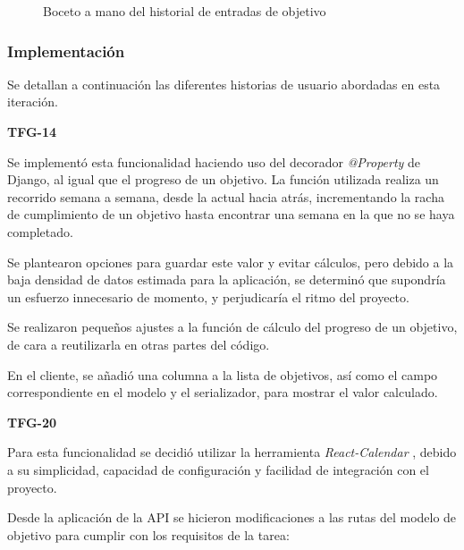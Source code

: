 \documentclass[10pt, a4paper]{aqademic}
\begin{document}
\begin{figure}[h!]
	\centering
	\caption{Boceto a mano del historial de entradas de objetivo}
\end{figure}


\subsubsection{Implementación}

Se detallan a continuación las diferentes historias de usuario abordadas en esta iteración.

\textbf{TFG-14}

Se implementó esta funcionalidad haciendo uso del decorador \textit{@Property} de Django, al igual que el progreso de un objetivo. La función utilizada realiza un recorrido semana a semana, desde la actual hacia atrás, incrementando la racha de cumplimiento de un objetivo hasta encontrar una semana en la que no se haya completado.

Se plantearon opciones para guardar este valor y evitar cálculos, pero debido a la baja densidad de datos estimada para la aplicación, se determinó que supondría un esfuerzo innecesario de momento, y perjudicaría el ritmo del proyecto.

Se realizaron pequeños ajustes a la función de cálculo del progreso de un objetivo, de cara a reutilizarla en otras partes del código.

En el cliente, se añadió una columna a la lista de objetivos, así como el campo correspondiente en el modelo y el serializador, para mostrar el valor calculado.

\medskip

\textbf{TFG-20}

Para esta funcionalidad se decidió utilizar la herramienta \textit{React-Calendar} \cite{maj__react-calendar_nodate}, debido a su simplicidad, capacidad de configuración y facilidad de integración con el proyecto. 

Desde la aplicación de la API se hicieron modificaciones a las rutas del modelo de objetivo para cumplir con los requisitos de la tarea:
\end{document}
